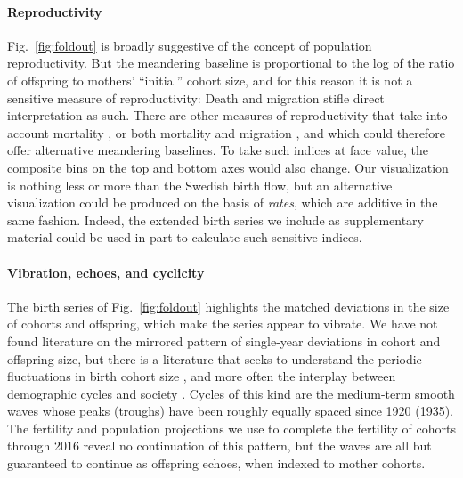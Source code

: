 \documentclass{article}
\begin{document}
\paragraph{Reproductivity}
Fig.~\ref{fig:foldout} is broadly suggestive of the concept of population reproductivity. But the meandering baseline is proportional to the log of the ratio of offspring to mothers' ``initial'' cohort size, and for this reason it is not a sensitive measure of reproductivity: Death and migration stifle direct interpretation as such. There are other measures of reproductivity that take into account mortality \citep{kuczynski1932fertility}, or both mortality and migration \citep[][inter alia]{hyrenius1951reproduction,ortega2007birth,preston2007intrinsic,wilson2013migration,ediev2014new}, and which could therefore offer alternative meandering baselines. To take such indices at face value, the composite bins on the top and bottom axes would also change. Our visualization is nothing less or more than the Swedish birth flow, but an alternative visualization could be produced on the basis of \emph{rates}, which are additive in the same fashion. Indeed, the extended birth series we include as supplementary material could be used in part to calculate such sensitive indices. 

\paragraph{Vibration, echoes, and cyclicity}
The birth series of Fig.~\ref{fig:foldout} highlights the matched deviations in the size of cohorts and offspring, which make the series appear to vibrate. We have not found literature on the mirrored pattern of single-year deviations in cohort and offspring size, but there is a literature that seeks to understand the periodic fluctuations in birth cohort size \citep[This literature largely derives from][]{lee1974formal}, and more often the interplay between demographic cycles and society \citep[e.g.,][]{easterlin1987birth}. Cycles of this kind are the medium-term smooth waves whose peaks (troughs) have been roughly equally spaced since 1920 (1935). The fertility and population projections we use to complete the fertility of cohorts through 2016 reveal no continuation of this pattern, but the waves are all but guaranteed to continue as offspring echoes, when indexed to mother cohorts.
\end{document}
